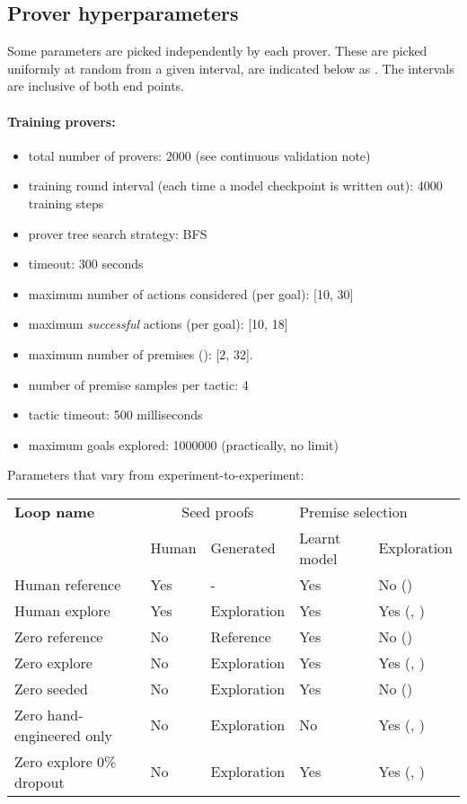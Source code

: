 \documentclass{article}
\begin{document}
\subsection{Prover hyperparameters}
Some parameters are picked independently by each prover. These are picked uniformly at random from a given interval, are indicated below as . The intervals are inclusive of both end points.
\paragraph{Training provers:}
\begin{itemize}
    \item total number of provers: 2000 (see continuous validation note)
    \item training round interval (each time a model checkpoint is written out): 4000 training steps
    \item prover tree search strategy: BFS
    \item timeout: 300 seconds
    \item maximum number of actions considered (per goal): [10, 30]
    \item maximum \emph{successful} actions (per goal): [10, 18]
    \item maximum number of premises (): [2, 32].
    \item number of premise samples per tactic: 4
    \item tactic timeout: 500 milliseconds
    \item maximum goals explored: 1000000 (practically, no limit)
\end{itemize}

Parameters that vary from experiment-to-experiment:

\begin{tabular}{lllll}
\toprule
\textbf{Loop name}        & \multicolumn{2}{c}{Seed proofs} & \multicolumn{2}{l}{\qquad Premise selection}\\
                          & Human & Generated  & Learnt model & Exploration \\
\midrule
Human reference           & Yes   & -          & Yes          & No () \\
Human explore             & Yes   & Exploration & Yes          & Yes (, ) \\
\midrule
Zero reference            & No    & Reference   & Yes          & No ()\\
Zero explore              & No    & Exploration & Yes          & Yes (, ) \\
Zero seeded               & No    & Exploration & Yes          & No () \\
Zero hand-engineered only & No    & Exploration & No           & Yes (, )\\
Zero explore 0\% dropout & No    & Exploration & Yes          & Yes (, ) \\
\bottomrule
\end{tabular}
\end{document}
